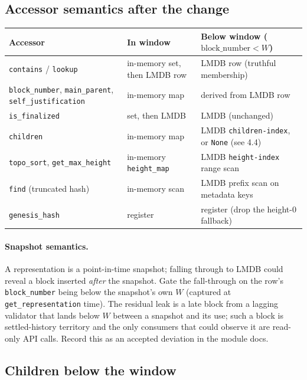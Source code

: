 \documentclass[11pt]{article}
\newcommand{\code}[1]{\texttt{#1}}
\begin{document}
\subsection{Accessor semantics after the change}

\begin{center}
\small
\begin{tabular}{@{}p{}p{}p{}@{}}
\toprule
Accessor & In window & Below window ($\mathrm{block\_number} < W$) \\
\midrule
\code{contains} / \code{lookup} & in-memory set, then LMDB row & LMDB row (truthful membership) \\
\code{block\_number}, \code{main\_parent}, \code{self\_justification} & in-memory map & derived from LMDB row \\
\code{is\_finalized} & set, then LMDB & LMDB (unchanged) \\
\code{children} & in-memory map & LMDB \code{children-index}, or \code{None} (see 4.4) \\
\code{topo\_sort}, \code{get\_max\_height} & in-memory \code{height\_map} & LMDB \code{height-index} range scan \\
\code{find} (truncated hash) & in-memory scan & LMDB prefix scan on metadata keys \\
\code{genesis\_hash} & register & register (drop the height-0 fallback) \\
\bottomrule
\end{tabular}
\end{center}

\paragraph{Snapshot semantics.} A representation is a point-in-time snapshot;
falling through to LMDB could reveal a block inserted \emph{after} the
snapshot. Gate the fall-through on the row's \code{block\_number} being below
the snapshot's own $W$ (captured at \code{get\_representation} time). The
residual leak is a late block from a lagging validator that lands below $W$
between a snapshot and its use; such a block is settled-history territory and
the only consumers that could observe it are read-only API calls. Record this
as an accepted deviation in the module docs.

\subsection{Children below the window}
\end{document}
